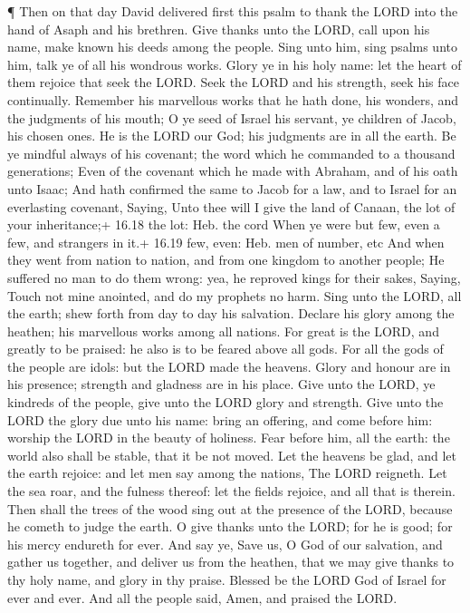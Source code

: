  ¶ Then on that day David delivered first this psalm to
thank the LORD into the hand of Asaph and his brethren. 
Give thanks unto the LORD, call upon his name, make known his deeds
among the people.  Sing unto him, sing psalms unto him, talk
ye of all his wondrous works.  Glory ye in his holy name:
let the heart of them rejoice that seek the LORD.  Seek the
LORD and his strength, seek his face continually.  Remember
his marvellous works that he hath done, his wonders, and the judgments
of his mouth;  O ye seed of Israel his servant, ye children
of Jacob, his chosen ones.  He is the LORD our God; his
judgments are in all the earth.  Be ye mindful always of
his covenant; the word which he commanded to a thousand generations;
 Even of the covenant which he made with Abraham, and of
his oath unto Isaac;  And hath confirmed the same to Jacob
for a law, and to Israel for an everlasting covenant, 
Saying, Unto thee will I give the land of Canaan, the lot of your
inheritance;+ 16.18 the lot: Heb. the cord  When ye were
but few, even a few, and strangers in it.+ 16.19 few, even: Heb. men of
number, etc  And when they went from nation to nation, and
from one kingdom to another people;  He suffered no man to
do them wrong: yea, he reproved kings for their sakes, 
Saying, Touch not mine anointed, and do my prophets no harm.
 Sing unto the LORD, all the earth; shew forth from day to
day his salvation.  Declare his glory among the heathen;
his marvellous works among all nations.  For great is the
LORD, and greatly to be praised: he also is to be feared above all gods.
 For all the gods of the people are idols: but the LORD
made the heavens.  Glory and honour are in his presence;
strength and gladness are in his place.  Give unto the
LORD, ye kindreds of the people, give unto the LORD glory and strength.
 Give unto the LORD the glory due unto his name: bring an
offering, and come before him: worship the LORD in the beauty of
holiness.  Fear before him, all the earth: the world also
shall be stable, that it be not moved.  Let the heavens be
glad, and let the earth rejoice: and let men say among the nations, The
LORD reigneth.  Let the sea roar, and the fulness thereof:
let the fields rejoice, and all that is therein.  Then
shall the trees of the wood sing out at the presence of the LORD,
because he cometh to judge the earth.  O give thanks unto
the LORD; for he is good; for his mercy endureth for ever. 
And say ye, Save us, O God of our salvation, and gather us together, and
deliver us from the heathen, that we may give thanks to thy holy name,
and glory in thy praise.  Blessed be the LORD God of Israel
for ever and ever. And all the people said, Amen, and praised the LORD.

